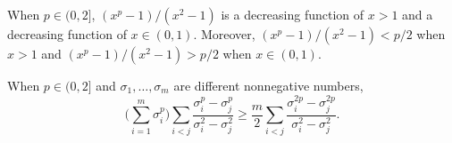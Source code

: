 \documentclass[10pt,a4paper]{amsart}
\begin{document}
\begin{lemma} \label{nns-dec}
When $p\in(0,2]$,
$(x^p-1)/(x^2-1)$ is a decreasing function of $x>1$ and a decreasing function of $x\in(0,1)$. Moreover, $(x^p-1)/(x^2-1)<p/2$ when $x>1$ and $(x^p-1)/(x^2-1)>p/2$ when $x\in(0,1).$
\end{lemma}

\begin{lemma}\label{chebyshev-2}
When $p\in(0,2]$ and $\sigma_1,\dots,\sigma_m$ are different nonnegative numbers,
\begin{equation}
\Big(\sum_{i=1}^m\sigma_i^p\Big)\sum_{i<j}\frac{\sigma_i^p-\sigma_j^p}{\sigma_i^2-\sigma_j^2}\ge\frac{m}{2}\sum_{i<j}\frac{\sigma_i^{2p}-\sigma_j^{2p}}{\sigma_i^2-\sigma_j^2}. \label{lemma4-1}
\end{equation}
\end{lemma}
\end{document}
